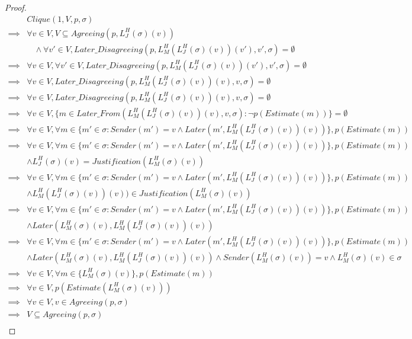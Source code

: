 \begin{proof}
  \begin{align}
            &Clique(1, V, p, \sigma) \\
    \implies&\forall v \in V, V \subseteq Agreeing(p, L^H_J(\sigma)(v)) \\
            &~~~~\land \forall v' \in V, Later\_Disagreeing(p, L^H_M(L^H_J(\sigma)(v))(v'), v', \sigma) = \emptyset \\
    \implies&\forall v \in V, \forall v' \in V, Later\_Disagreeing(p, L^H_M(L^H_J(\sigma)(v))(v'), v', \sigma) = \emptyset \\
    \implies&\forall v \in V, Later\_Disagreeing(p, L^H_M(L^H_J(\sigma)(v))(v), v, \sigma) = \emptyset \\
    \implies&\forall v \in V, Later\_Disagreeing(p, L^H_M(L^H_J(\sigma)(v))(v), v, \sigma) = \emptyset \\
    \implies&\forall v \in V, \{m \in Later\_From(L^H_M(L^H_J(\sigma)(v))(v), v, \sigma) : \neg p(Estimate(m)) \}  = \emptyset \\
    \implies&\forall v \in V, \forall m \in \{m' \in \sigma : Sender(m') = v \land Later(m', L^H_M(L^H_J(\sigma)(v))(v))\}, p(Estimate(m)) \\
    \implies&\forall v \in V, \forall m \in \{m' \in \sigma : Sender(m') = v \land Later(m', L^H_M(L^H_J(\sigma)(v))(v))\}, p(Estimate(m)) \\
    &\land L^H_J(\sigma)(v) = Justification(L^H_M(\sigma)(v)) \\
    \implies&\forall v \in V, \forall m \in \{m' \in \sigma : Sender(m') = v \land Later(m', L^H_M(L^H_J(\sigma)(v))(v))\}, p(Estimate(m)) \\
    &\land L^H_M(L^H_J(\sigma)(v))(v)) \in Justification(L^H_M(\sigma)(v))\\
    \implies&\forall v \in V, \forall m \in \{m' \in \sigma : Sender(m') = v \land Later(m', L^H_M(L^H_J(\sigma)(v))(v))\}, p(Estimate(m)) \\
    &\land Later(L^H_M(\sigma)(v), L^H_M(L^H_J(\sigma)(v))(v)) \\
    \implies&\forall v \in V, \forall m \in \{m' \in \sigma : Sender(m') = v \land Later(m', L^H_M(L^H_J(\sigma)(v))(v))\}, p(Estimate(m)) \\
    &\land Later(L^H_M(\sigma)(v), L^H_M(L^H_J(\sigma)(v))(v)) \land Sender(L^H_M(\sigma)(v)) = v \land L^H_M(\sigma)(v) \in \sigma\\
    \implies&\forall v \in V, \forall m \in \{L^H_M(\sigma)(v)\}, p(Estimate(m)) \\
    \implies&\forall v \in V, p(Estimate(L^H_M(\sigma)(v))) \\
    \implies&\forall v \in V, v \in Agreeing(p, \sigma) \\
    \implies& V \subseteq Agreeing(p, \sigma) \\
  \end{align}
\end{proof}



